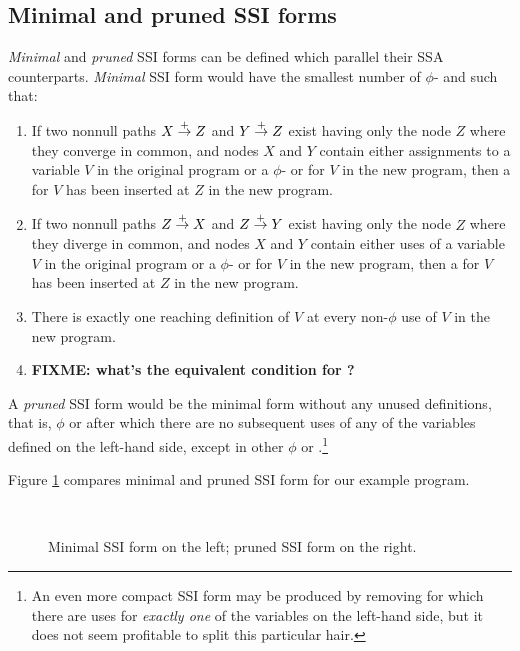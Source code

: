 \documentclass[12pt,notitlepage,twoside]{article}
\begin{document}
\subsection{Minimal and pruned SSI forms}
\emph{Minimal} and \emph{pruned} SSI forms can be defined which
parallel their SSA counterparts.  \emph{Minimal} SSI form would have the
smallest number of $\phi$- and  such that:
\begin{enumerate}
\item If two nonnull paths $X \stackrel{+}{\rightarrow} Z$ and $Y \stackrel{+}{\rightarrow} Z$
exist having only the node $Z$ where they converge in common,
and nodes $X$ and $Y$ contain either assignments to a variable $V$ in the
original program or a $\phi$- or \sigfunction{} for $V$ in the new program,
then a \phifunction{} for $V$ has been inserted at $Z$ in the new program.
\item If two nonnull paths $Z \stackrel{+}{\rightarrow} X$ and $Z \stackrel{+}{\rightarrow} Y$
exist having only the node $Z$ where they diverge in common,
and nodes $X$ and $Y$ contain either uses of a variable $V$ in the
original program or a $\phi$- or \sigfunction{} for $V$ in the new program,
then a \sigfunction{} for $V$ has been inserted at $Z$ in the new program.
\item There is exactly one reaching definition of $V$ at every
non-$\phi$ use of $V$ in the new program.
\item \textbf{FIXME: what's the equivalent condition for ?}
\end{enumerate}

A \emph{pruned} SSI form would be the minimal form without any unused
definitions, that is, $\phi$ or  after which there are no
subsequent uses of any of the variables defined on the left-hand side,
except in other $\phi$ or .\footnote{An even more
compact SSI form may be produced by removing  for which
there are uses for \emph{exactly one} of the variables on the
left-hand side, but it does not seem profitable to split this
particular hair.}

Figure \ref{fig:prunedssi} compares minimal and pruned SSI form for
our example program.
\begin{figure}\label{fig:prunedssi}
\begin{center}
 \vline\ 
\end{center}
\caption{Minimal SSI form on the left; pruned SSI form on the right.}
\end{figure}
\end{document}

